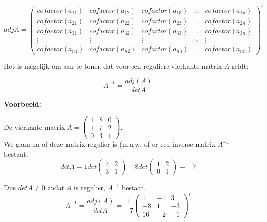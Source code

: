 \begin{framed}

\[ adj{A}=\left( \begin{matrix}
cofactor(a_{11}) & cofactor(a_{12}) & cofactor(a_{13}) & \ldots & cofactor(a_{1n}) \\
cofactor(a_{21}) & cofactor(a_{22}) & cofactor(a_{23}) & \ldots & cofactor(a_{2n}) \\ 
cofactor(a_{31}) & cofactor(a_{32}) & cofactor(a_{33}) & \ldots & cofactor(a_{3n}) \\
\vdots & \vdots &  \vdots & \ddots & \vdots \\
cofactor(a_{n1}) & cofactor(a_{n2}) & cofactor(a_{n3}) & \ldots & cofactor(a_{nn})
\end{matrix} \right)^{t}           \]

\end{framed}

Het is mogelijk om aan te tonen dat voor een reguliere vierkante matrix $A$ geldt:

\begin{framed}
	\[  A^{-1}=\frac{adj(A)}{det A}    \]
\end{framed}

{\bf Voorbeeld:}

De vierkante matrix $A= \left( \begin{matrix} 1 & 8 & 0 \\ 1 & 7 & 2 \\ 0 & 3 & 1 \end{matrix} \right)$.\\

We gaan na of deze matrix regulier is (m.a.w. of er een inverse matrix $A^{-1}$ bestaat.\\
  
\[ det A= 1 det \left( \begin{matrix} 7 & 2 \\ 3 & 1 \end{matrix} \right) -8 det \left( \begin{matrix} 1 & 2 \\ 0 & 1 \end{matrix} \right) = -7   \]

Dus $det A \neq 0$ zodat $A$ is regulier, $A^{-1}$ bestaat.\\

\[  A^{-1}= \frac{adj(A)}{det A} = \frac{1}{-7} \left( \begin{matrix}
1 & -1 & 3 \\
-8 & 1 & -3 \\
16 & -2 & -1 
\end{matrix} \right)^{t}                   \]

